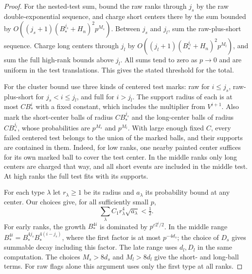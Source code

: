 \begin{proof}
For the nested-test sum, bound the raw ranks through \(j_s\) by the raw double-exponential sequence, and charge short centers there by the sum bounded by \(O((j_s+1)(B_*^{j_s}+H_n)^2p^{M_s})\). Between \(j_s\) and \(j_l\), sum the raw-plus-short sequence. Charge long centers through \(j_l\) by \(O((j_l+1)(B_*^{j_l}+H_n)^2p^{M_l})\), and sum the full high-rank bounds above \(j_l\). All sums tend to zero as \(p\to0\) and are uniform in the test translations. This gives the stated threshold for the total.

For the cluster bound use three kinds of centered test marks: raw for \(i\le j_s\), raw-plus-short for \(j_s<i\le j_l\), and full for \(i>j_l\). The support radius of each is at most \(CB_*^i\) with a fixed constant, which includes the multiplier from \(V^{i+1}\). Also mark the short-center balls of radius \(CB_*^{j_s}\) and the long-center balls of radius \(CB_*^{j_l}\), whose probabilities are \(p^{M_s}\) and \(p^{M_l}\). With large enough fixed \(C\), every failed centered test belongs to the union of the marked balls, and their supports are contained in them. Indeed, for low ranks, one nearby painted center suffices for its own marked ball to cover the test center. In the middle ranks only long centers are charged that way, and all short events are included in the middle test. At high ranks the full test fits with its supports.

For each type \(\lambda\) let \(r_\lambda\ge1\) be its radius and \(a_\lambda\) its probability bound at any center. Our choices give, for all sufficiently small \(p\),
\begin{equation}\label{eq:ballsum}
\sum_\lambda C_1r_\lambda^4 \sqrt{a_\lambda}<\tfrac12 .
\end{equation}
For early ranks, the growth \(B_*^{4i}\) is dominated by \(p^{c2^i/2}\). In the middle range \(B_*^{4i}=B_*^{4j_s}B_*^{4(i-j_s)}\), where the first factor is at most \(p^{-4d_s}\); the choice of \(D_s\) gives summable decay including this factor. The late range uses \(d_l,D_l\) in the same computation. The choices \(M_s>8d_s\) and \(M_l>8d_l\) give the short- and long-ball terms. For raw flags alone this argument uses only the first type at all ranks.


\end{proof}

